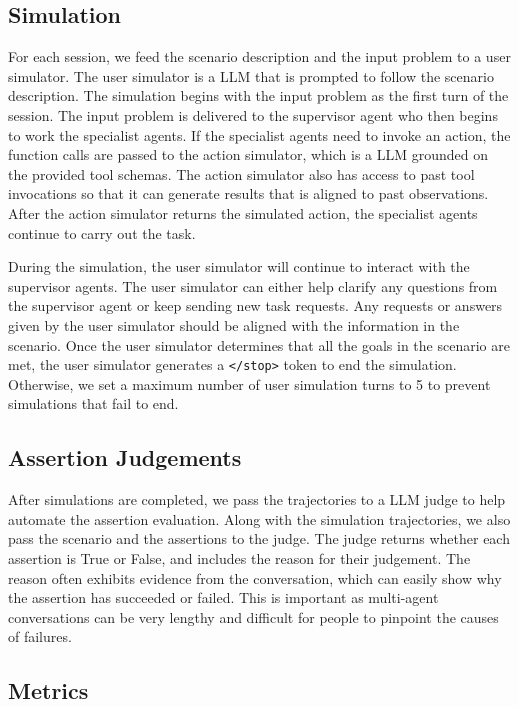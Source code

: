 \subsection{Simulation}

For each session, we feed the scenario description and the input problem to a user simulator. The user simulator is a LLM that is prompted to follow the scenario description. The simulation begins with the input problem as the first turn of the session. The input problem is delivered to the supervisor agent who then begins to work the specialist agents. If the specialist agents need to invoke an action, the function calls are passed to the action simulator, which is a LLM grounded on the provided tool schemas.  The action simulator also has access to past tool invocations so that it can generate results that is aligned to past observations. After the action simulator returns the simulated action, the specialist agents continue to carry out the task.

During the simulation, the user simulator will continue to interact with the supervisor agents. The user simulator can either help clarify any questions from the supervisor agent or keep sending new task requests.  Any requests or answers given by the user simulator should be aligned with the information in the scenario. Once the user simulator determines that all the goals in the scenario are met, the user simulator generates a \texttt{</stop>} token to end the simulation. Otherwise, we set a maximum number of user simulation turns to 5 to prevent simulations that fail to end.

\subsection{Assertion Judgements}

After simulations are completed, we pass the trajectories to a LLM judge to help automate the assertion evaluation. Along with the simulation trajectories, we also pass the scenario and the assertions to the judge. The judge returns whether each assertion is True or False, and includes the reason for their judgement. The reason often exhibits evidence from the conversation, which can easily show why the assertion has succeeded or failed. This is important as multi-agent conversations can be very lengthy and difficult for people to pinpoint the causes of failures.

\subsection{Metrics}

